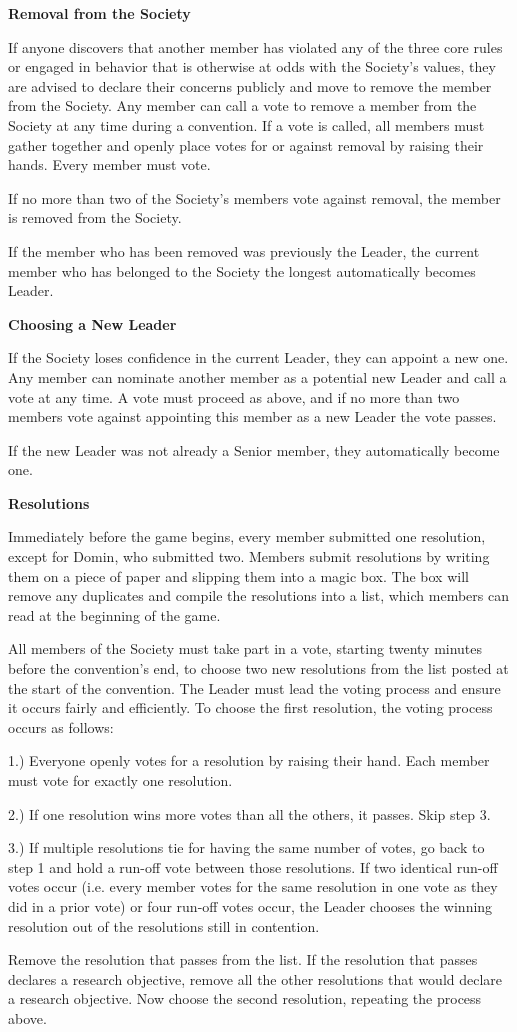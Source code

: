 \documentclass[green]{Sel}
\begin{document}
\name{\gVoting{}}
\textbf{Removal from the Society}

If anyone discovers that another member has violated any of the three core rules or engaged in behavior that is otherwise at odds with the Society's values, they are advised to declare their concerns publicly and move to remove the member from the Society. Any member can call a vote to remove a member from the Society at any time during a convention. If a vote is called, all members must gather together and openly place votes for or against removal by raising their hands. Every member must vote.

If no more than two of the Society's members vote against removal, the member is removed from the Society.

If the member who has been removed was previously the Leader, the current member who has belonged to the Society the longest automatically becomes Leader.

\textbf{Choosing a New Leader}

If the Society loses confidence in the current Leader, they can appoint a new one. Any member can nominate another member as a potential new Leader and call a vote at any time. A vote must proceed as above, and if no more than two members vote against appointing this member as a new Leader the vote passes.

If the new Leader was not already a Senior member, they automatically become one.

\textbf{Resolutions}

Immediately before the game begins, every member submitted one resolution, except for Domin, who submitted two. Members submit resolutions by writing them on a piece of paper and slipping them into a magic box. The box will remove any duplicates and compile the resolutions into a list, which members can read at the beginning of the game.

All members of the Society must take part in a vote, starting twenty minutes before the convention's end, to choose two new resolutions from the list posted at the start of the convention. The Leader must lead the voting process and ensure it occurs fairly and efficiently. To choose the first resolution, the voting process occurs as follows:

1.) Everyone openly votes for a resolution by raising their hand. Each member must vote for exactly one resolution.

2.) If one resolution wins more votes than all the others, it passes. Skip step 3.

3.) If multiple resolutions tie for having the same number of votes, go back to step 1 and hold a run-off vote between those resolutions. If two identical run-off votes occur (i.e. every member votes for the same resolution in one vote as they did in a prior vote) or four run-off votes occur, the Leader chooses the winning resolution out of the resolutions still in contention.

Remove the resolution that passes from the list. If the resolution that passes declares a research objective, remove all the other resolutions that would declare a research objective. Now choose the second resolution, repeating the process above.
\end{document}
